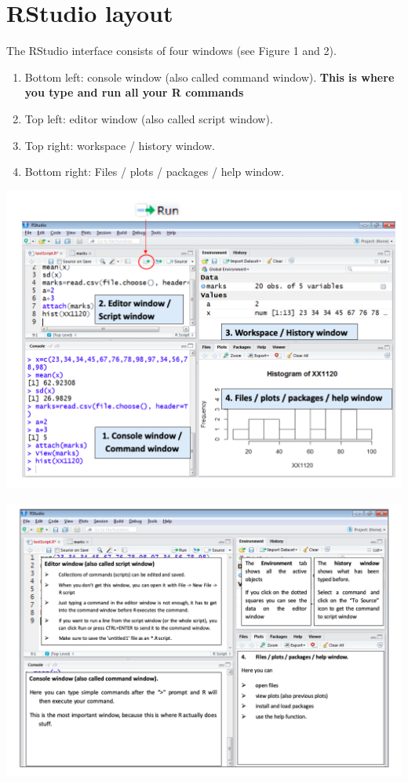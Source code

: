 \documentclass[
]{book}
\begin{document}
\hypertarget{rstudio-layout}{%
\section{RStudio layout}\label{rstudio-layout}}

The RStudio interface consists of four windows (see Figure 1 and 2).

\begin{enumerate}
\def\labelenumi{\arabic{enumi}.}
\item
  Bottom left: console window (also called command window). \textbf{This is where you type and run all your R commands}
\item
  Top left: editor window (also called script window).
\item
  Top right: workspace / history window.
\item
  Bottom right: Files / plots / packages / help window.
\end{enumerate}

\begin{center}\includegraphics[width=1\linewidth]{figure/Rstudio1} \end{center}

\begin{center}\includegraphics[width=1\linewidth]{figure/Rstudio2} \end{center}
\end{document}
